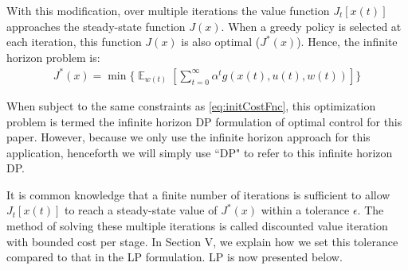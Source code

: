 \documentclass[conference]{IEEEtran}
\DeclareMathOperator{\E}{\mathbb{E}}
\begin{document}
With this modification, over multiple iterations the value function $J_{t}[x(t)]$ approaches the steady-state function $J(x)$. When a greedy policy is selected at each iteration, this function $J(x)$ is also optimal ($J^{*}(x)$). Hence, the infinite horizon problem is:
\begin{multline} \label{eq:DP}
J^{*}(x)= \min\Biggl\{\mathop{\E}_{w(t)}\left[\sum_{t=0}^{\infty}\alpha^{t}g(x(t),u(t),w(t))\right]\Biggr\}
\end{multline}

When subject to the same constraints as \eqref{eq:initCostFnc}, this optimization problem is termed the infinite horizon DP formulation of optimal control for this paper. However, because we only use the infinite horizon approach for this application, henceforth we will simply use ``DP" to refer to this infinite horizon DP.

It is common knowledge that a finite number of iterations is sufficient to allow $J_{t}[x(t)]$ to reach a steady-state value of $J^{*}(x)$ within a tolerance $\epsilon$. The method of solving these multiple iterations is called discounted value iteration with bounded cost per stage. In Section V, we explain how we set this tolerance compared to that in the LP formulation. LP is now presented below.


\end{document}
